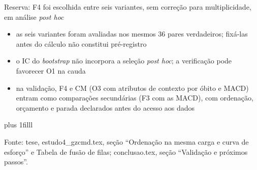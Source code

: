 \documentclass[aspectratio=169,11pt]{beamer}
\let\ressalvatexto\relax
\newcommand{\fontealign}{\raggedright}
\newcommand{\fonte}[2][tese, ]{\par\vskip 0pt plus 1filll
  \ifx\ressalvatexto\relax\else{\raggedright\footnotesize\color{black!70}\textit{Ressalva:} \ressalvatexto\par}\vskip 3pt\fi
  {\fontealign\tiny\color{black!65}Fonte: #1#2.\par}\vskip 3pt\global\let\ressalvatexto\relax}
\newcommand{\itens}[1]{\begin{itemize}#1\end{itemize}}
\begin{document}
\begin{frame}[label=R07]{Reserva: F4 foi escolhida entre seis variantes, sem correção para multiplicidade, em análise \textit{post hoc}}
\footnotesize
\begin{center}
\end{center}
\itens{\item as seis variantes foram avaliadas nos mesmos 36 pares verdadeiros; fixá-las antes do cálculo não constitui pré-registro
\item o IC do \textit{bootstrap} não incorpora a seleção \textit{post hoc}; a verificação pode favorecer O1 na cauda
\item na validação, F4 e CM (O3 com atributos de contexto por óbito e MACD) entram como comparações secundárias (F3 com as MACD), com ordenação, orçamento e parada declarados antes do acesso aos dados}
\fonte{estudo4\_gzcmd.tex, seção ``Ordenação na mesma carga e curva de esforço'' e Tabela de fusão de filas; conclusao.tex, seção ``Validação e próximos passos''}
\end{frame}
\end{document}
